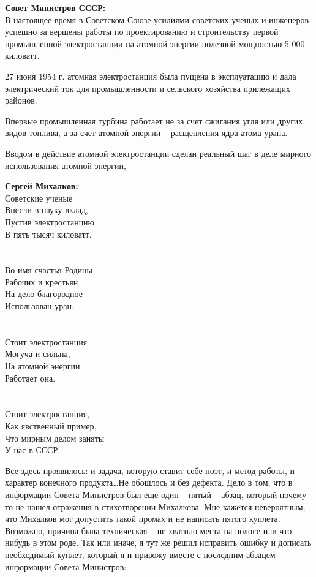 \documentclass{book}
\begin{document}
\begin{minipage}{0.4\textwidth}
  \textbf{Совет Министров СССР:}\\
  В настоящее время в Советском Союзе усилиями советских ученых и инженеров успешно за вершены работы по проектированию и строительству первой промышленной электростанции на атомной энергии полезной мощностью 5 000 киловатт.
  
  27 июня 1954 г. атомная электростанция была пущена в эксплуатацию и дала электрический ток для промышленности и сельского
  хозяйства прилежащих районов.
  
  Впервые промышленная турбина работает не за счет сжигания угля или других видов топлива, а за счет атомной энергии -- расщепления ядра атома урана. 
  
  Вводом в действие атомной электростанции сделан реальный шаг  в деле мирного использования атомной энергии, 
\end{minipage}
\hfill
\begin{minipage}{0.4\textwidth}
  \textbf{Сергей Михалков:}\\
  Советские ученые \\
  Внесли в науку вклад, \\
  Пустив электростанцию \\
  В пять тысяч киловатт. \\
  \\ \\
  Во имя счастья Родины \\
  Рабочих и крестьян \\
  На дело благородное \\
  Использован уран. \\
  \\  \\
  Стоит электростанция \\
  Могуча и сильна, \\
  На атомной энергии \\
  Работает она. \\
  \\  \\  
  Стоит электростанция, \\
  Как явственный пример, \\
  Что мирным делом заняты \\
  У нас в СССР.
\end{minipage}

Все здесь проявилось: и задача, которую ставит себе поэт, и метод работы, и характер конечного продукта\ldots Не обошлось и без 
дефекта. Дело в том, что в информации Совета Министров был еще один -- пятый -- абзац, который почему-то не нашел отражения в 
стихотворении Михалкова. Мне кажется невероятным, что Михалков мог допустить такой промах и не написать пятого куплета. 
Возможно, причина была техническая -- не хватило места на полосе или что-нибудь в этом роде. Так или иначе, я тут же решил 
исправить ошибку и дописать необходимый куплет, который я и привожу вместе с последним абзацем информации Совета Министров:
\end{document}
